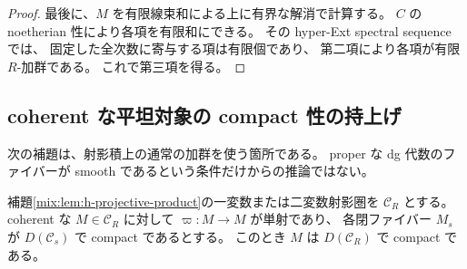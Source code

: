 \begin{proof}
最後に、$M$ を有限線束和による上に有界な解消で計算する。
$C$ の noetherian 性により各項を有限和にできる。
その hyper-Ext spectral sequence では、
固定した全次数に寄与する項は有限個であり、
第二項により各項が有限 $R$-加群である。
これで第三項を得る。
\end{proof}

\subsection{coherent な平坦対象の compact 性の持上げ}

次の補題は、射影積上の通常の加群を使う箇所である。
proper な dg 代数のファイバーが smooth であるという条件だけからの推論ではない。

\begin{lemma}
\label{mix:lem:coherent-compact-lift}
補題\ref{mix:lem:h-projective-product}の一変数または二変数射影圏を $\mathcal C_R$ とする。
coherent な $M\in\mathcal C_R$ に対して
$\varpi:M\to M$ が単射であり、
各閉ファイバー $M_s$ が $D(\mathcal C_s)$ で compact であるとする。
このとき $M$ は $D(\mathcal C_R)$ で compact である。
\end{lemma}

